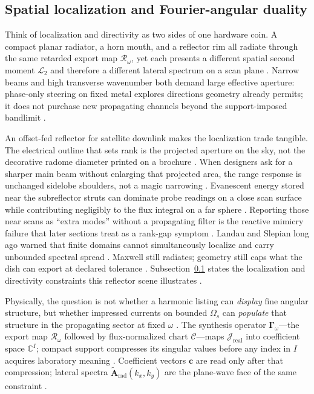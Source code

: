 \subsection{Spatial localization and Fourier-angular duality}
\label{sec:ch441}
Think of localization and directivity as two sides of one hardware coin. A compact planar radiator, a horn mouth, and a reflector rim all radiate through the same retarded export map $\mathcal{R}_\omega$, yet each presents a different spatial second moment $\mathcal{L}_{2}$ and therefore a different lateral spectrum on a scan plane \cite{jackson1999}. Narrow beams and high transverse wavenumber both demand large effective aperture: phase-only steering on fixed metal explores directions geometry already permits; it does not purchase new propagating channels beyond the support-imposed bandlimit \cite{devaney2004}.
\begin{physicalvignette}
An offset-fed reflector for satellite downlink makes the localization trade tangible. The electrical outline that sets rank is the projected aperture on the sky, not the decorative radome diameter printed on a brochure \cite{harrington2001}. When designers ask for a sharper main beam without enlarging that projected area, the range response is unchanged sidelobe shoulders, not a magic narrowing \cite{jackson1999}.
Evanescent energy stored near the subreflector struts can dominate probe readings on a close scan surface while contributing negligibly to the flux integral on a far sphere \cite{stratton1941}. Reporting those near scans as ``extra modes'' without a propagating filter is the reactive mimicry failure that later sections treat as a rank-gap symptom \cite{hansen1988}.
Landau and Slepian long ago warned that finite domains cannot simultaneously localize and carry unbounded spectral spread \cite{landau1962}. Maxwell still radiates; geometry still caps what the dish can export at declared tolerance \cite{maxwell1873}.
Subsection~\ref{sec:ch441} states the localization and directivity constraints this reflector scene illustrates \cite{stratton1941}.
\end{physicalvignette}
Physically, the question is not whether a harmonic listing can \emph{display} fine angular structure, but whether impressed currents on bounded $\Omega_s$ can \emph{populate} that structure in the propagating sector at fixed $\omega$ \cite{stratton1941}. The synthesis operator $\boldsymbol{\Gamma}_\omega$---the export map $\mathcal{R}_\omega$ followed by flux-normalized chart $\mathcal{C}$---maps $\mathcal{J}_{\mathrm{real}}$ into coefficient space $\mathbb{C}^{I}$; compact support compresses its singular values before any index in $I$ acquires laboratory meaning \cite{harrington2001}. Coefficient vectors $\mathbf{c}$ are read only after that compression; lateral spectra $\widetilde{\mathbf{A}}_{\mathrm{rad}}(k_x,k_y)$ are the plane-wave face of the same constraint \cite{hansen1988}.
